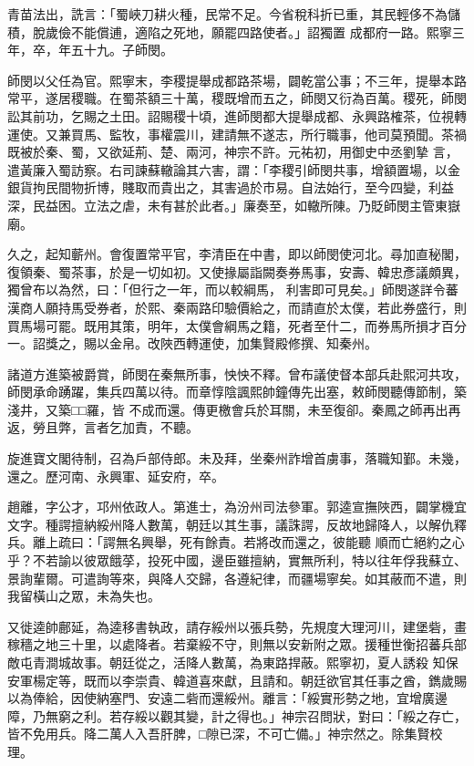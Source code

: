 \begin{pinyinscope}
 青苗法出，詵言：「蜀峽刀耕火種，民常不足。今省稅科折已重，其民輕侈不為儲積，脫歲儉不能償逋，適陷之死地，願罷四路使者。」詔獨置
 成都府一路。熙寧三年，卒，年五十九。子師閔。



 師閔以父任為官。熙寧末，李稷提舉成都路茶場，闢乾當公事；不三年，提舉本路常平，遂居稷職。在蜀茶額三十萬，稷既增而五之，師閔又衍為百萬。稷死，師閔訟其前功，乞賜之土田。詔賜稷十頃，進師閔都大提舉成都、永興路榷茶，位視轉運使。又兼買馬、監牧，事權震川，建請無不遂志，所行職事，他司莫預聞。茶禍既被於秦、蜀，又欲延荊、楚、兩河，神宗不許。元祐初，用御史中丞劉摯
 言，遣黃廉入蜀訪察。右司諫蘇轍論其六害，謂：「李稷引師閔共事，增額置場，以金銀貨拘民間物折博，賤取而貴出之，其害過於市易。自法始行，至今四變，利益深，民益困。立法之虐，未有甚於此者。」廉奏至，如轍所陳。乃貶師閔主管東嶽廟。



 久之，起知蘄州。會復置常平官，李清臣在中書，即以師閔使河北。尋加直秘閣，復領秦、蜀茶事，於是一切如初。又使掾屬詣闕奏券馬事，安壽、韓忠彥議頗異，獨曾布以為然，曰：「但行之一年，而以較綱馬，
 利害即可見矣。」師閔遂詳令蕃漢商人願持馬受券者，於熙、秦兩路印驗價給之，而請直於太僕，若此券盛行，則買馬場可罷。既用其策，明年，太僕會綱馬之籍，死者至什二，而券馬所損才百分一。詔獎之，賜以金帛。改陜西轉運使，加集賢殿修撰、知秦州。



 諸道方進築被爵賞，師閔在秦無所事，怏怏不釋。曾布議使督本部兵赴熙河共攻，師閔承命踴躍，集兵四萬以待。而章惇陰諷熙帥鐘傳先出塞，敕師閔聽傳節制，築淺井，又築□□羅，皆
 不成而還。傳更檄會兵於耳關，未至復卻。秦鳳之師再出再返，勞且弊，言者乞加責，不聽。



 旋進寶文閣待制，召為戶部侍郎。未及拜，坐秦州詐增首虜事，落職知鄞。未幾，還之。歷河南、永興軍、延安府，卒。



 趙離，字公才，邛州依政人。第進士，為汾州司法參軍。郭逵宣撫陜西，闢掌機宜文字。種諤擅納綏州降人數萬，朝廷以其生事，議誅諤，反故地歸降人，以解仇釋兵。離上疏曰：「諤無名興舉，死有餘責。若將改而還之，彼能聽
 順而亡絕約之心乎？不若諭以彼眾餓莩，投死中國，邊臣雖擅納，實無所利，特以往年俘我蘇立、景詢輩爾。可遣詢等來，與降人交歸，各遵紀律，而疆場寧矣。如其蔽而不遣，則我留橫山之眾，未為失也。



 又徙逵帥鄜延，為逵移書執政，請存綏州以張兵勢，先規度大理河川，建堡砦，畫稼穡之地三十里，以處降者。若棄綏不守，則無以安新附之眾。援種世衡招蕃兵部敵屯青澗城故事。朝廷從之，活降人數萬，為東路捍蔽。熙寧初，夏人誘殺
 知保安軍楊定等，既而以李崇貴、韓道喜來獻，且請和。朝廷欲官其任事之酋，鐫歲賜以為俸給，因使納塞門、安遠二砦而還綏州。離言：「綏實形勢之地，宜增廣邊障，乃無窮之利。若存綏以觀其變，計之得也。」神宗召問狀，對曰：「綏之存亡，皆不免用兵。降二萬人入吾肝脾，□隙已深，不可亡備。」神宗然之。除集賢校理。




\end{pinyinscope}
